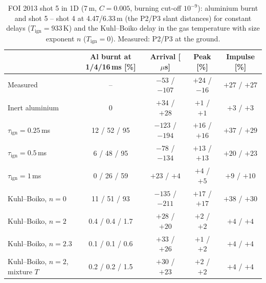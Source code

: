 \documentclass{article}
\begin{document}
\begin{table}[htbp]
    \centering
    \caption{FOI 2013 shot 5 in 1D (7\,m, $C = 0.005$, burning cut-off $10^{-9}$): aluminium burnt and shot 5 -- shot 4 at 4.47/6.33\,m (the P2/P3 slant distances) for constant delays ($T_\text{ign} = 933$\,K) and the Kuhl--Boiko delay in the gas temperature with size exponent $n$ ($T_\text{ign} = 0$). Measured: P2/P3 at the ground.}
    \label{tab:foi_kb}
    \small
    \begin{tabular}{lcccc}
        \toprule
         & Al burnt at 1/4/16\,ms [\%] & Arrival [$\mu$s] & Peak [\%] & Impulse [\%] \\
        \midrule
        Measured & -- & $-53$ / $-107$ & $+24$ / $-16$ & $+27$ / $+27$ \\
        Inert aluminium & 0 & $+34$ / $+28$ & $+1$ / $+1$ & $+3$ / $+3$ \\
        $\tau_\text{ign} = 0.25$\,ms & 12 / 52 / 95 & $-123$ / $-194$ & $+16$ / $+16$ & $+37$ / $+29$ \\
        $\tau_\text{ign} = 0.5$\,ms & 6 / 48 / 95 & $-78$ / $-134$ & $+13$ / $+13$ & $+20$ / $+23$ \\
        $\tau_\text{ign} = 1$\,ms & 0 / 26 / 59 & $+23$ / $+4$ & $+4$ / $+5$ & $+9$ / $+10$ \\
        Kuhl--Boiko, $n = 0$ & 11 / 51 / 93 & $-135$ / $-211$ & $+17$ / $+17$ & $+38$ / $+30$ \\
        Kuhl--Boiko, $n = 2$ & 0.4 / 0.4 / 1.7 & $+28$ / $+20$ & $+2$ / $+2$ & $+4$ / $+4$ \\
        Kuhl--Boiko, $n = 2.3$ & 0.1 / 0.1 / 0.6 & $+33$ / $+26$ & $+1$ / $+2$ & $+4$ / $+4$ \\
        Kuhl--Boiko, $n = 2$, mixture $T$ & 0.2 / 0.2 / 1.5 & $+30$ / $+23$ & $+2$ / $+2$ & $+4$ / $+4$ \\
        \bottomrule
    \end{tabular}
\end{table}
\end{document}
